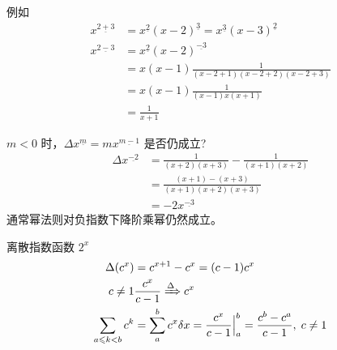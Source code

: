 \documentclass[mode=geye, chinesefont=founder]{elegantnote}
\newcommand{\fallingfactorial}[1]{%
  ^{\underline{#1}}%
}
\begin{document}
例如
\begin{align*}
    x\fallingfactorial{2+3} 
    &= x\fallingfactorial{2}(x-2)\fallingfactorial{3}
    =x\fallingfactorial{3}(x-3)\fallingfactorial{2} \\
    x\fallingfactorial{2-3}
    &= x\fallingfactorial{2}(x-2)\fallingfactorial{-3}\\
    &= x(x-1)\frac{1}{(x-2+1)(x-2+2)(x-2+3)}\\
    &= x(x-1)\frac{1}{(x-1)x(x+1)}\\
    &= \frac{1}{x+1}
\end{align*}

$ m<0 $ 时，$ \Delta x\fallingfactorial{m} = m x\fallingfactorial{m-1} $ 是否仍成立?
\begin{align*}
    \Delta x\fallingfactorial{-2} 
    &= \frac{1}{(x+2)(x+3)} - \frac{1}{(x+1)(x+2)} \\
    &= \frac{(x+1)-(x+3)}{(x+1)(x+2)(x+3)} \\
    &= -2x\fallingfactorial{-3}
\end{align*}
通常幂法则对负指数下降阶乘幂仍然成立。

离散指数函数 $ 2^x $ 
\begin{align*}
    \Delta (c^x) &= c^{x+1}-c^x = (c-1)c^x \\
    c \neq 1 & \frac{c^x}{c-1}\xRightarrow{\Delta}c^x\\
    \sum_{a\leqslant k <b}c^k &= \sum_{a}^{b}c^x \delta x = \frac{c^x}{c-1}\Big|_a^b =\frac{c^b-c^a}{c-1}, \; c\neq 1
\end{align*}
\end{document}

